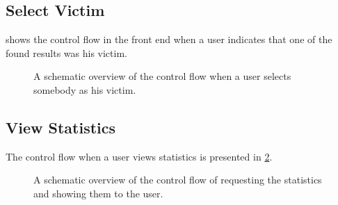 \subsection{Select Victim}
	 shows the control flow in the front end when a user indicates that one of the found results was his victim.

		\begin{figure}
			\caption{A schematic overview of the control flow when a user selects somebody as his victim.}
			\label{fig:1:controlflowVictim}
		\end{figure}		

\subsection{View Statistics}
	The control flow when a user views statistics is presented in \cref{fig:1:controlflowStat}.


	\begin{figure}
		\caption{A schematic overview of the control flow of requesting the statistics and showing them to the user.}
		\label{fig:1:controlflowStat}
	\end{figure}